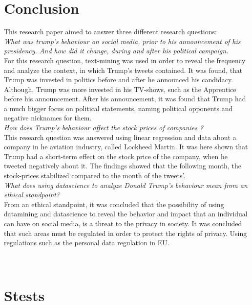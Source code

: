 \documentclass[12pt]{article}
\begin{document}
\section{Conclusion}
This research paper aimed to answer three different research questions: \\

\textit{What was trump's behaviour on social media, prior to his announcement of his presidency. And how did it change, during and after his political campaign.}\\

For this research question, text-mining was used in order to reveal the frequency and analyze the context, in which Trump's tweets contained. It was found, that Trump was invested in politics before and after he announced his candidacy. Although, Trump was more invested in his TV-shows, such as the Apprentice before his announcement. After his announcement, it was found that Trump had a much bigger focus on political statements, naming political opponents and negative nicknames for them. \\

\textit{How does Trump's behaviour affect the stock prices of companies ?} \\

This research question was answered using linear regression and data about a company in he aviation industry, called Lockheed Martin. It was here shown that Trump had a short-term effect on the stock price of the company, when he tweeted negatively about it. The findings showed that the following month, the stock-prices stabilized compared to the month of the tweets'.\\


\textit{What does using datascience to analyze Donald Trump's behaviour mean from an ethical standpoint?}\\
 
From an ethical standpoint, it was concluded that the possibility of using datamining and datascience to reveal the behavior and impact that an individual can have on social media, is a threat to the privacy in society. It was concluded that such areas must be regulated in order to protect the rights of privacy. Using regulations such as the personal data regulation in EU.  


\cleardoublepage





\cleardoublepage

\appendix
\section{\\Stests}
\end{document}
